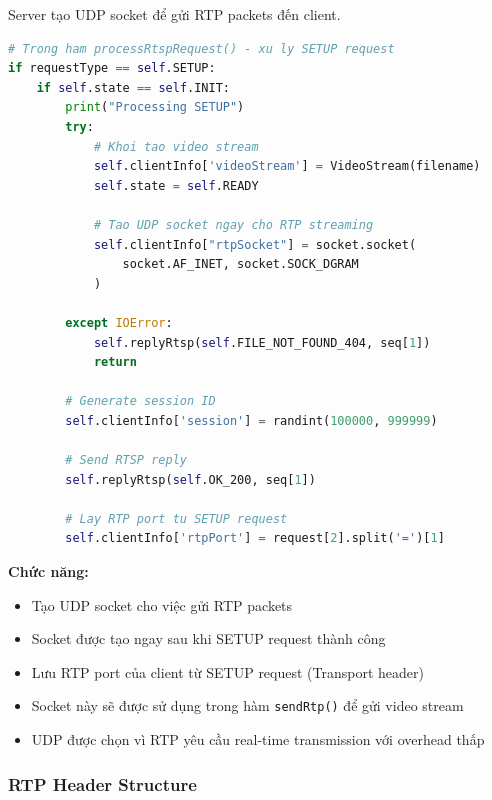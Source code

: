 \documentclass[a4paper,12pt]{article}
\begin{document}
Server tạo UDP socket để gửi RTP packets đến client.

\begin{lstlisting}[language=Python, caption={Initialize RTP Socket on Server}]
# Trong ham processRtspRequest() - xu ly SETUP request
if requestType == self.SETUP:
    if self.state == self.INIT:
        print("Processing SETUP")
        try:
            # Khoi tao video stream
            self.clientInfo['videoStream'] = VideoStream(filename)
            self.state = self.READY
            
            # Tao UDP socket ngay cho RTP streaming
            self.clientInfo["rtpSocket"] = socket.socket(
                socket.AF_INET, socket.SOCK_DGRAM
            )
            
        except IOError:
            self.replyRtsp(self.FILE_NOT_FOUND_404, seq[1])
            return
        
        # Generate session ID
        self.clientInfo['session'] = randint(100000, 999999)
        
        # Send RTSP reply
        self.replyRtsp(self.OK_200, seq[1])
        
        # Lay RTP port tu SETUP request
        self.clientInfo['rtpPort'] = request[2].split('=')[1]
\end{lstlisting}

\textbf{Chức năng:}
\begin{itemize}
    \item Tạo UDP socket cho việc gửi RTP packets
    \item Socket được tạo ngay sau khi SETUP request thành công
    \item Lưu RTP port của client từ SETUP request (Transport header)
    \item Socket này sẽ được sử dụng trong hàm \texttt{sendRtp()} để gửi video stream
    \item UDP được chọn vì RTP yêu cầu real-time transmission với overhead thấp
\end{itemize}

\subsubsection{RTP Header Structure}
\end{document}
